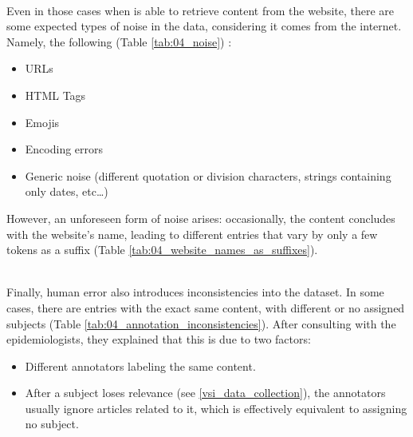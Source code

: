 




\label{vsi_issues_data_noise}
\ \\

Even in those cases when \trafilatura{} is able to retrieve content from the website, there are some expected types of noise in the data, considering it comes from the internet.
Namely, the following  (Table \ref{tab:04_noise}) :
\begin{itemize}
    \item URLs
    \item HTML Tags
    \item Emojis
    \item Encoding errors
    \item Generic noise (different quotation or division characters, strings containing only dates, etc\ldots)
\end{itemize}








However, an unforeseen form of noise arises: occasionally, the content concludes with the website's name, leading to different entries that vary by only a few tokens as a suffix (Table \ref{tab:04_website_names_as_suffixes}).




\label{vsi_issues_annotation_inconsistencies}
\ \\

Finally, human error also introduces inconsistencies into the \VSI{} dataset. In some cases, there are entries with the exact same content, with different or no assigned subjects (Table \ref{tab:04_annotation_inconsistencies}). After consulting with the epidemiologists, they explained that this is due to two factors:

\begin{itemize}
    \item Different annotators labeling the same content.
    \item After a subject loses relevance (see \headerName{} \ref{vsi_data_collection}), the annotators usually ignore articles related to it, which is effectively equivalent to assigning no subject.
\end{itemize}





